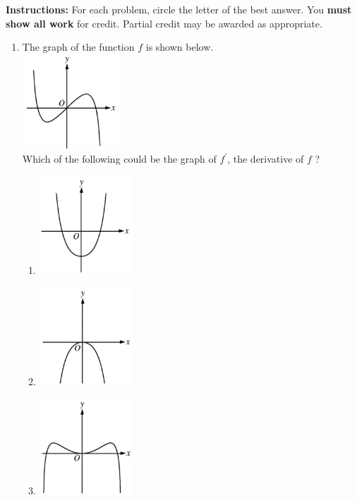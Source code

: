 \documentclass{article}
\begin{document}
\pagestyle{fancy}
\fancyhf{}
\renewcommand{\footrulewidth}{0.4pt}

\noindent
\textbf{Instructions:} For each problem, circle the letter of the best answer.
You \textbf{must show all work} for credit. Partial credit may be awarded as appropriate.

\begin{enumerate}
	\itemsep2em
	\item
	\begin{minipage}[t]{\linewidth}
		The graph of the function \(f\) is shown below.\\
\includegraphics[width=1.41in]{media/9fa7ebca-42e0-529d-a9b6-bb493a83de14.jpg}\\
Which of the following could be the graph of \(f^{\prime}\), the
derivative of \(f\) ?
\vspace{1em}
		\begin{enumerate}
		\itemsep1em
			\item \includegraphics[width=1.38in]{media/67cece36-2bb7-5801-b710-e80e849bce43.jpg}
			\item \includegraphics[width=1.3833333333333333in]{media/34b040f4-6501-5ae0-8cd3-c8435e7f9b34.jpg}
			\item \includegraphics[width=1.3833333333333333in]{media/cc751a13-6b93-550d-a8de-7810aeda45df.jpg}

\end{enumerate}
\end{minipage}
\end{enumerate}
\end{document}
